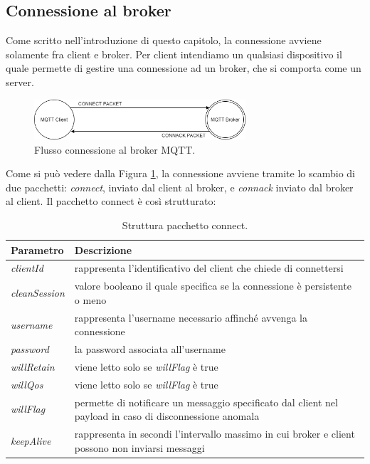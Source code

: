 \documentclass[Lau,binding=0.6cm,noexaminfo=true]{sapthesis}
\begin{document}
\begin{large}
\subsection{Connessione al broker}
Come scritto nell'introduzione di questo capitolo, la connessione avviene solamente fra client e broker. Per client intendiamo un qualsiasi dispositivo il quale permette di gestire una connessione ad un broker, che si comporta come un server. 

\begin{figure}[h]
\centering
\includegraphics[width=0.7\textwidth]{images/connect-connack.png}
\caption{Flusso connessione al broker MQTT.}
\label{fig:connect-connack}
\end{figure}

Come si può vedere dalla Figura \ref{fig:connect-connack}, la connessione avviene tramite lo scambio di due pacchetti: \textit{connect}, inviato dal client al broker, e \textit{connack} inviato dal broker al client. Il pacchetto connect è così strutturato:
\begin{table}[h]
\caption{Struttura pacchetto connect.}
\label{tab:connect}
\begin{tabular}{lp{}}
\toprule
\textbf{Parametro} & \textbf{Descrizione} \\
\midrule
\textit{clientId} & rappresenta l'identificativo del client che chiede di connettersi \\
\textit{cleanSession} & valore booleano il quale specifica se la connessione è persistente o meno \\
\textit{username} & rappresenta l'username necessario affinché avvenga la connessione \\
\textit{password} & la password associata all'username \\
\textit{willRetain} & viene letto solo se \textit{willFlag} è true \\
\textit{willQos} & viene letto solo se \textit{willFlag} è true \\
\textit{willFlag} & permette di notificare un messaggio specificato dal client nel payload in caso di disconnessione anomala \\
\textit{keepAlive} & rappresenta in secondi l'intervallo massimo in cui broker e client possono non inviarsi messaggi \\
\bottomrule
\end{tabular}
\end{table}


\end{large}
\end{document}
